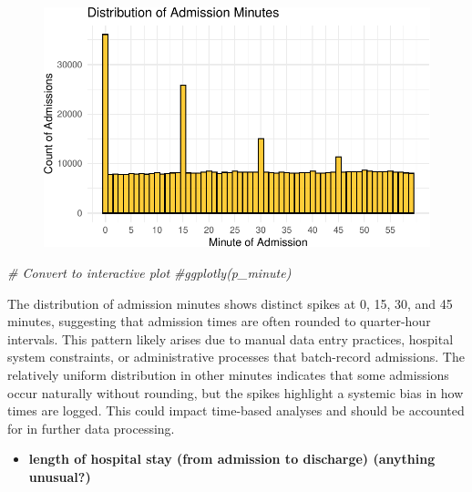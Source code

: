 \documentclass[
]{article}
\newenvironment{Shaded}{\begin{snugshade}}{\end{snugshade}}
\newcommand{\CommentTok}[1]{\textcolor[rgb]{0.56,0.35,0.01}{\textit{#1}}}
\providecommand{\tightlist}{%
  \setlength{\itemsep}{0pt}\setlength{\parskip}{0pt}}\usepackage{longtable,booktabs,array}
\begin{document}
\begin{figure}[H]

{\centering \includegraphics{hw3_files/figure-pdf/unnamed-chunk-25-1.pdf}

}

\end{figure}

\begin{Shaded}
\begin{Highlighting}[]
\CommentTok{\# Convert to interactive plot}
\CommentTok{\#ggplotly(p\_minute)}
\end{Highlighting}
\end{Shaded}

The distribution of admission minutes shows distinct spikes at 0, 15,
30, and 45 minutes, suggesting that admission times are often rounded to
quarter-hour intervals. This pattern likely arises due to manual data
entry practices, hospital system constraints, or administrative
processes that batch-record admissions. The relatively uniform
distribution in other minutes indicates that some admissions occur
naturally without rounding, but the spikes highlight a systemic bias in
how times are logged. This could impact time-based analyses and should
be accounted for in further data processing.

\begin{itemize}
\tightlist
\item
  \textbf{length of hospital stay (from admission to discharge)
  (anything unusual?)}
\end{itemize}
\end{document}
